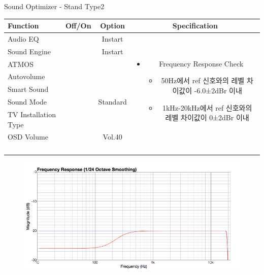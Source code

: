 \begin{frame}[t]{Sound Optimizer - Stand Type2}
\begin{tiny}
\begin{tabular}{@{}lccc@{}}
\toprule
Function & Off/On & Option & Specification \\
\midrule
Audio EQ & \color{black}{Off} & Instart &
\multirow{10}{60mm}{
\begin{itemize}
\item Frequency Response Check
	\begin{itemize}
	\item 50Hz에서 ref 신호와의 레벨 차이값이 -6.0±2dBr 이내
	\item 1kHz-20kHz에서 ref 신호와의 레벨 차이값이 0±2dBr 이내
	\end{itemize}
\end{itemize}
} \\
Sound Engine & \color{blue}{On} & Instart & \\
ATMOS & \color{black}{Off}  & & \\
Autovolume & \color{black}{Off} & & \\
Smart Sound & \color{black}{Off} & & \\
Sound Mode & \color{blue}{On} & Standard & \\
TV Installation Type & \color{blue}{On} & \color{blue}{Standtype2} & \\
OSD Volume & \color{blue}{On} & Vol.40 & \\
& & & \\
& & & \\
& & & \\
& & & \\
\midrule
\end{tabular}
\end{tiny}

\begin{figure}[b]
\includegraphics[height=0.4\textwidth]{figures/standtype.png}
\end{figure}

\end{frame}
